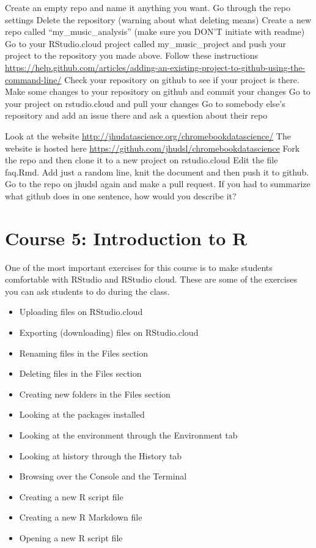 \documentclass[]{book}
\providecommand{\tightlist}{%
  \setlength{\itemsep}{0pt}\setlength{\parskip}{0pt}}
\begin{document}
Create an empty repo and name it anything you want.
Go through the repo settings
Delete the repository (warning about what deleting means)
Create a new repo called ``my\_music\_analysis'' (make sure you DON'T initiate with readme)
Go to your RStudio.cloud project called my\_music\_project and push your project to the repository you made above. Follow these instructions \url{https://help.github.com/articles/adding-an-existing-project-to-github-using-the-command-line/}
Check your repository on github to see if your project is there.
Make some changes to your repository on github and commit your changes
Go to your project on rstudio.cloud and pull your changes
Go to somebody else's repository and add an issue there and ask a question about their repo

Look at the website \url{http://jhudatascience.org/chromebookdatascience/}
The website is hosted here \url{https://github.com/jhudsl/chromebookdatascience}
Fork the repo and then clone it to a new project on rstudio.cloud
Edit the file faq.Rmd. Add just a random line, knit the document and then push it to github.
Go to the repo on jhudsl again and make a pull request.
If you had to summarize what github does in one sentence, how would you describe it?

\hypertarget{intro-r}{%
\chapter*{Course 5: Introduction to R}\label{intro-r}}

One of the most important exercises for this course is to make students comfortable with RStudio and RStudio cloud. These are some of the exercises you can ask students to do during the class.

\begin{itemize}
\tightlist
\item
  Uploading files on RStudio.cloud
\item
  Exporting (downloading) files on RStudio.cloud
\item
  Renaming files in the Files section
\item
  Deleting files in the Files section
\item
  Creating new folders in the Files section
\item
  Looking at the packages installed
\item
  Looking at the environment through the Environment tab
\item
  Looking at history through the History tab
\item
  Browsing over the Console and the Terminal
\item
  Creating a new R script file
\item
  Creating a new R Markdown file
\item
  Opening a new R script file
\end{itemize}
\end{document}
